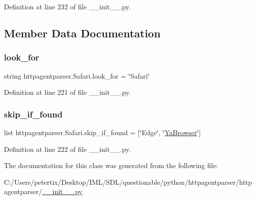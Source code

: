 Definition at line 232 of file \+\_\+\+\_\+init\+\_\+\+\_\+.\+py.



\subsection{Member Data Documentation}
\hypertarget{classhttpagentparser_1_1_safari_a2cd5aabde41192cd9e912de24e94bb59}{}\label{classhttpagentparser_1_1_safari_a2cd5aabde41192cd9e912de24e94bb59} 
\subsubsection{\texorpdfstring{look\+\_\+for}{look\_for}}
{\footnotesize\ttfamily string httpagentparser.\+Safari.\+look\+\_\+for = \char`\"{}Safari\char`\"{}\hspace{0.3cm}{\ttfamily [static]}}



Definition at line 221 of file \+\_\+\+\_\+init\+\_\+\+\_\+.\+py.

\hypertarget{classhttpagentparser_1_1_safari_a0e451bfa2174a48aced1b64f05eda439}{}\label{classhttpagentparser_1_1_safari_a0e451bfa2174a48aced1b64f05eda439} 
\subsubsection{\texorpdfstring{skip\+\_\+if\+\_\+found}{skip\_if\_found}}
{\footnotesize\ttfamily list httpagentparser.\+Safari.\+skip\+\_\+if\+\_\+found = \mbox{[}\char`\"{}Edge\char`\"{}, \char`\"{}\hyperlink{classhttpagentparser_1_1_ya_browser}{Ya\+Browser}\char`\"{}\mbox{]}\hspace{0.3cm}{\ttfamily [static]}}



Definition at line 222 of file \+\_\+\+\_\+init\+\_\+\+\_\+.\+py.



The documentation for this class was generated from the following file\+:\begin{DoxyCompactItemize}
\item 
C\+:/\+Users/petertix/\+Desktop/\+I\+M\+L/\+S\+D\+L/questionable/python/httpagentparser/httpagentparser/\hyperlink{____init_____8py}{\+\_\+\+\_\+init\+\_\+\+\_\+.\+py}\end{DoxyCompactItemize}
